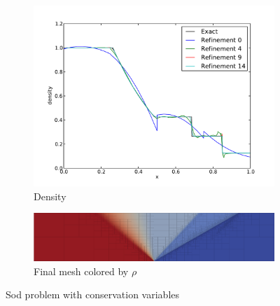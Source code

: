 \documentclass[Dissertation.tex]{subfiles}
\begin{document}
\begin{figure}[ht]
\centering
\begin{subfigure}[t]{\textwidth}
\centering
\includegraphics[width=\textwidth]{Dissertation/Sod/FormulationComparison/conservation-den.pdf}
\caption{Density}
\end{subfigure}
\begin{subfigure}[t]{0.9\textwidth}
\centering
\includegraphics[width=\textwidth]{Sod/FormulationComparison/Form1Mesh15.png}
\caption{Final mesh colored by $\rho$}
\end{subfigure}
\caption{Sod problem with conservation variables}
\label{fig:SodConservation}
\end{figure}
\end{document}
